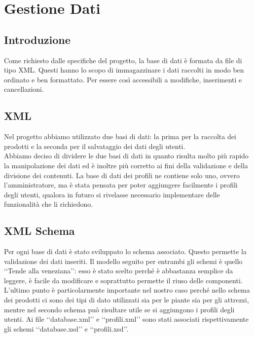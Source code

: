 \section{Gestione Dati}{
	\subsection{Introduzione}
	Come richiesto dalle specifiche del progetto, la base di dati è formata da file di tipo XML. Questi hanno lo scopo di immagazzinare i dati raccolti in modo ben ordinato e ben formattato. Per essere così accessibili a modifiche, inserimenti e cancellazioni.
	\subsection{XML}
	Nel progetto abbiamo utilizzato due basi di dati: la prima per la raccolta dei prodotti e la seconda per il salvataggio dei dati degli utenti.\\
Abbiamo deciso di dividere le due basi di dati in quanto risulta molto più rapido la manipolazione dei dati
ed è inoltre più corretto ai fini della validazione e della divisione dei contenuti.
La base di dati dei profili ne contiene solo uno, ovvero l'amministratore, ma è stata pensata per poter aggiungere facilmente i profili degli utenti, qualora in futuro si rivelasse necessario implementare delle funzionalità che li richiedono. 
	\subsection{XML Schema}
	Per ogni base di dati è stato sviluppato lo schema associato. Questo permette la validazione dei dati inseriti. Il modello seguito per entrambi gli schemi è quello ‘‘Tende alla veneziana’’: esso è stato scelto perché è abbastanza semplice da leggere, è facile da modificare e soprattutto permette il riuso delle componenti. L'ultimo punto è particolarmente importante nel nostro caso perché nello schema dei prodotti ci sono dei tipi di dato utilizzati sia per le piante sia per gli attrezzi, mentre nel secondo schema può risultare utile se si aggiungono i profili degli utenti.
	Ai file ‘‘database.xml’’ e ‘‘profili.xml’’ sono stati associati rispettivamente gli schemi ‘‘database.xsd’’ e ‘‘profili.xsd’’.
	
}
